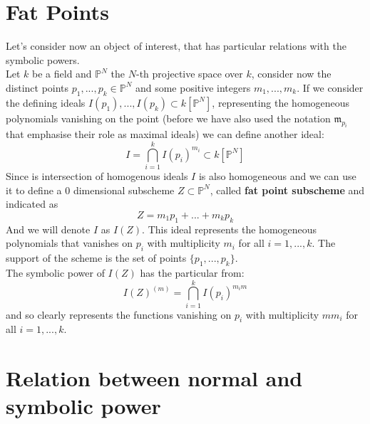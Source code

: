 \documentclass[a4wide]{book}
\theoremstyle{plain}
\theoremstyle{remark}
\theoremstyle{definition}
\newcommand{\PP}{\mathbb{P}}
\newcommand{\mm}{\mathfrak{m}}
\newcounter{que}
\begin{document}
\section{Fat Points}

Let's consider now an object of interest, that has particular relations with the symbolic powers.\\
Let $ k $ be a field and $ \PP^N$ the $ N $-th projective space over $ k $, consider now the distinct points $ p_1, ... ,p_k \in  \PP^N$ and some positive integers $ m_1 , ... ,m_k $. If we consider the defining ideals $ I(p_1), ... , I(p_k)  \subset k [\PP^N]$, representing the homogeneous polynomials vanishing on the point (before we have also used the notation $ \mm_{p_i}$ that emphasise their role as maximal ideals) we can define another ideal:
\begin{equation}\label{eq:fat_pt}
	I = \bigcap_{i=1}^k I(p_i)^{m_i} \subset k [\PP^N]
\end{equation}
Since is intersection of homogenous ideals $ I $ is also homogeneous and we can use it to define a $ 0 $ dimensional subscheme $ Z \subset \PP^N $, called \textbf{fat point subscheme} and indicated as 
\[
Z = m_1 p_1 + ... +  m_k p_k
\]
And we will denote $ I $ as $ I(Z) $. This ideal represents the homogeneous polynomials that vanishes on $ p_i $ with multiplicity $ m_i $ for all $ i = 1, ... , k $. The support of the scheme is the set of points $ \{ p_1 , ... , p_k\} $.\\
The symbolic power of $ I(Z) $ has the particular from:
\[
I(Z)^{(m)} = \bigcap_{i=1}^k I(p_i)^{m_im}
\]
and so clearly represents the functions vanishing on $ p_i $ with multiplicity $ mm_i $ for all $ i = 1, ... , k $. 


%



\section{Relation between normal and symbolic power}
\end{document}
